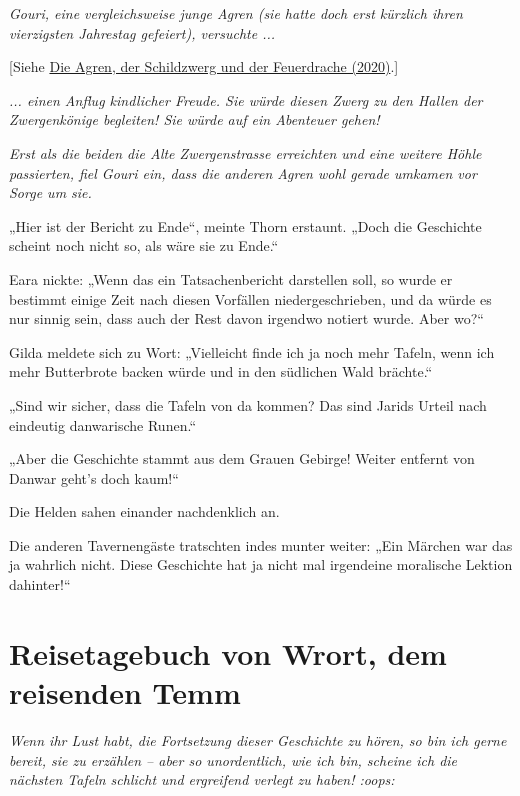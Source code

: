 \textit{Gouri, eine vergleichsweise junge Agren (sie hatte doch erst kürzlich ihren vierzigsten Jahrestag gefeiert), versuchte ...}

[Siehe \hyperref[2020-die-agren-der-schildzwerg-und-der-feuerdrache]{Die Agren, der Schildzwerg und der Feuerdrache (2020)}.]

\textit{... einen Anflug kindlicher Freude. Sie würde diesen Zwerg zu den Hallen der Zwergenkönige begleiten! Sie würde auf ein Abenteuer gehen!}

\textit{Erst als die beiden die Alte Zwergenstrasse erreichten und eine weitere Höhle passierten, fiel Gouri ein, dass die anderen Agren wohl gerade umkamen vor Sorge um sie.}\bigskip







„Hier ist der Bericht zu Ende“, meinte Thorn erstaunt. „Doch die Geschichte scheint noch nicht so, als wäre sie zu Ende.“

Eara nickte: „Wenn das ein Tatsachenbericht darstellen soll, so wurde er bestimmt einige Zeit nach diesen Vorfällen niedergeschrieben, und da würde es nur sinnig sein, dass auch der Rest davon irgendwo notiert wurde. Aber wo?“

Gilda meldete sich zu Wort: „Vielleicht finde ich ja noch mehr Tafeln, wenn ich mehr Butterbrote backen würde und in den südlichen Wald brächte.“

„Sind wir sicher, dass die Tafeln von da kommen? Das sind Jarids Urteil nach eindeutig danwarische Runen.“

„Aber die Geschichte stammt aus dem Grauen Gebirge! Weiter entfernt von Danwar geht’s doch kaum!“

Die Helden sahen einander nachdenklich an.

Die anderen Tavernengäste tratschten indes munter weiter: „Ein Märchen war das ja wahrlich nicht. Diese Geschichte hat ja nicht mal irgendeine moralische Lektion dahinter!“


\newpage
\section{Reisetagebuch von Wrort, dem reisenden Temm}


\textit{Wenn ihr Lust habt, die Fortsetzung dieser Geschichte zu hören, so bin ich gerne bereit, sie zu erzählen – aber so unordentlich, wie ich bin, scheine ich die nächsten Tafeln schlicht und ergreifend verlegt zu haben! :oops:}

